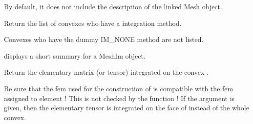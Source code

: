\documentclass[a4paper,11pt,english]{sphinxmanual}
\begin{document}
\begin{fulllineitems}
\begin{fulllineitems}
By default, it does not include the description of the linked
Mesh object.

\end{fulllineitems}


\begin{fulllineitems}
\label{\detokenize{python/cmdref_MeshIm:getfem.MeshIm.convex_index}}
Return the list of convexes who have a integration method.

Convexes who have the dummy IM\_NONE method are not listed.

\end{fulllineitems}


\begin{fulllineitems}
\label{\detokenize{python/cmdref_MeshIm:getfem.MeshIm.display}}
displays a short summary for a MeshIm object.

\end{fulllineitems}


\begin{fulllineitems}
\label{\detokenize{python/cmdref_MeshIm:getfem.MeshIm.eltm}}
Return the elementary matrix (or tensor) integrated on the convex .


Be sure that the fem used for the construction of  is compatible
with the fem assigned to element  ! This is not checked by the
function ! If the argument  is given, then the elementary tensor
is integrated on the face  of  instead of the whole convex.

\end{fulllineitems}



\end{fulllineitems}
\end{document}
